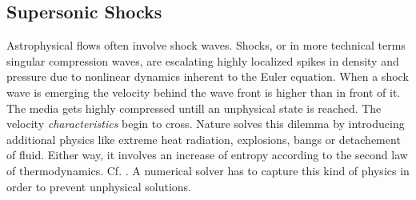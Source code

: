 \subsection{Supersonic Shocks}
\label{sec:theory-shocks}
Astrophysical flows often involve shock waves. Shocks, or in more technical
terms singular compression waves, are escalating highly localized spikes in
density and pressure due to nonlinear dynamics inherent to the Euler equation.
When a shock wave is emerging the velocity behind the wave front is higher than
in front of it. The media gets highly compressed untill an unphysical state is
reached. The velocity \emph{characteristics} begin to cross. Nature solves this
dilemma by introducing additional physics like extreme heat radiation,
explosions, bangs or detachement of fluid. Either way, it involves an increase
of entropy according to the second law of thermodynamics. Cf. \cite{Salas1996}. A
numerical solver has to capture this kind of physics in order to prevent
unphysical solutions. 

